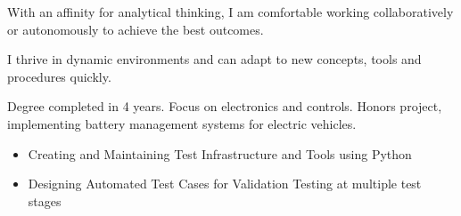 \documentclass[9pt,a4paper,ragged2e,withhyper]{altacv}
\begin{document}


\makecvheader
\divider
{}

\begin{paracol}{2}


  With an affinity for analytical thinking, I am comfortable working collaboratively or autonomously to achieve the best outcomes. 

  I thrive in dynamic environments and can adapt to new concepts, tools and procedures quickly.



  \divider\smallskip


  \divider\smallskip

  \divider
  \divider
  \medskip



  Degree completed in 4 years. Focus on electronics and controls. Honors
  project, implementing battery management systems for electric
  vehicles.

  \switchcolumn


  \begin{itemize}
    \item Creating and Maintaining Test Infrastructure and Tools using Python
    \item Designing Automated Test Cases for Validation Testing at multiple test stages
  \end{itemize}


\end{paracol}
\end{document}
